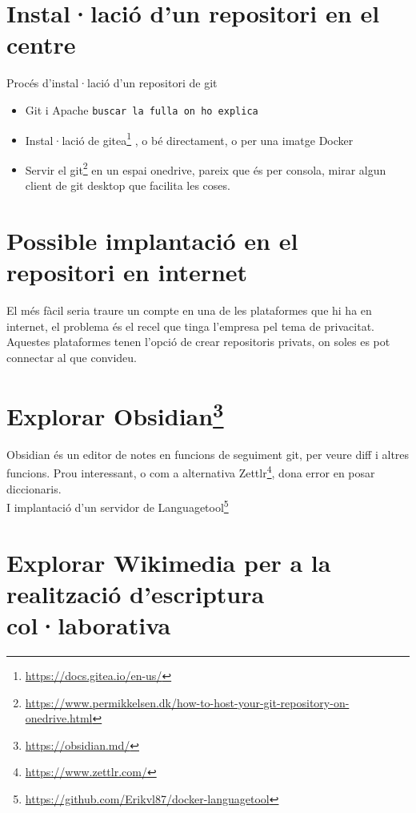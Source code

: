 \documentclass[
  10pt,
]{krantz}
\DeclareRobustCommand{\href}[2]{#2\footnote{\url{#1}}}
\begin{document}
\hypertarget{installaciuxf3-dun-repositori-en-el-centre}{%
\section{Instal·lació d'un repositori en el centre}\label{installaciuxf3-dun-repositori-en-el-centre}}

Procés d'instal·lació d'un repositori de git

\begin{itemize}
\item
  Git i Apache \texttt{buscar\ la\ fulla\ on\ ho\ explica}
\item
  Instal·lació de \href{https://docs.gitea.io/en-us/}{gitea} , o bé directament, o per una imatge Docker
\item
  Servir el \href{https://www.permikkelsen.dk/how-to-host-your-git-repository-on-onedrive.html}{git} en un espai onedrive, pareix que és per consola, mirar algun client de git desktop que facilita les coses.
\end{itemize}

\hypertarget{possible-implantaciuxf3-en-el-repositori-en-internet}{%
\section{Possible implantació en el repositori en internet}\label{possible-implantaciuxf3-en-el-repositori-en-internet}}

El més fàcil seria traure un compte en una de les plataformes que hi ha en internet, el problema és el recel que tinga l'empresa pel tema de privacitat. Aquestes plataformes tenen l'opció de crear repositoris privats, on soles es pot connectar al que convideu.

\hypertarget{explorar-obsidian}{%
\section{\texorpdfstring{Explorar \href{https://obsidian.md/}{Obsidian}}{Explorar Obsidian}}\label{explorar-obsidian}}

Obsidian és un editor de notes en funcions de seguiment git, per veure diff i altres funcions. Prou interessant, o com a alternativa \href{https://www.zettlr.com/}{Zettlr}, dona error en posar diccionaris.\\
I implantació d'un servidor de \href{https://github.com/Erikvl87/docker-languagetool}{Languagetool}

\hypertarget{explorar-wikimedia-per-a-la-realitzaciuxf3-descriptura-collaborativa}{%
\section{Explorar Wikimedia per a la realització d'escriptura col·laborativa}\label{explorar-wikimedia-per-a-la-realitzaciuxf3-descriptura-collaborativa}}
\end{document}

